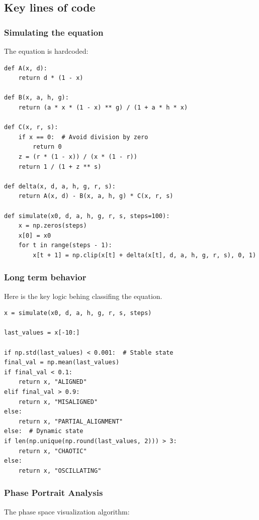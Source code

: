 \documentclass[a4paper, 11pt]{article}
\begin{document}
\subsection{Key lines of code}
\subsubsection{Simulating the equation}
The equation is hardcoded:

\begin{lstlisting}[caption=Alignment equation]
def A(x, d):
    return d * (1 - x)

def B(x, a, h, g):
    return (a * x * (1 - x) ** g) / (1 + a * h * x)

def C(x, r, s):
    if x == 0:  # Avoid division by zero
        return 0
    z = (r * (1 - x)) / (x * (1 - r))
    return 1 / (1 + z ** s)

def delta(x, d, a, h, g, r, s):
    return A(x, d) - B(x, a, h, g) * C(x, r, s)

def simulate(x0, d, a, h, g, r, s, steps=100):
    x = np.zeros(steps)
    x[0] = x0
    for t in range(steps - 1):
        x[t + 1] = np.clip(x[t] + delta(x[t], d, a, h, g, r, s), 0, 1)
\end{lstlisting}

\subsubsection{Long term behavior}
Here is the key logic behing classifing the equation.

\begin{lstlisting}[caption=Classification]
x = simulate(x0, d, a, h, g, r, s, steps)

last_values = x[-10:]

if np.std(last_values) < 0.001:  # Stable state
final_val = np.mean(last_values)
if final_val < 0.1:
    return x, "ALIGNED"
elif final_val > 0.9:
    return x, "MISALIGNED"
else:
    return x, "PARTIAL_ALIGNMENT"
else:  # Dynamic state
if len(np.unique(np.round(last_values, 2))) > 3:
    return x, "CHAOTIC"
else:
    return x, "OSCILLATING"
\end{lstlisting}

\subsubsection{Phase Portrait Analysis}
The phase space visualization algorithm:
\end{document}
